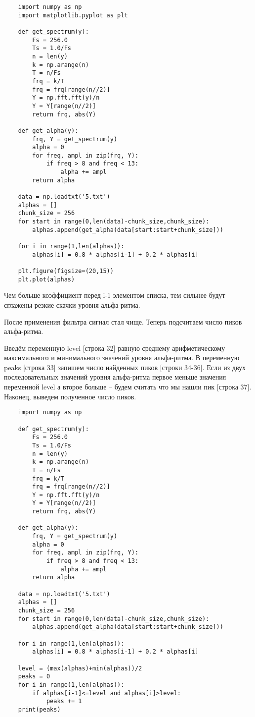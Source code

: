 \begin{verbatim}
    import numpy as np
    import matplotlib.pyplot as plt

    def get_spectrum(y):
        Fs = 256.0
        Ts = 1.0/Fs
        n = len(y)
        k = np.arange(n)
        T = n/Fs
        frq = k/T
        frq = frq[range(n//2)]
        Y = np.fft.fft(y)/n
        Y = Y[range(n//2)]
        return frq, abs(Y)

    def get_alpha(y):
        frq, Y = get_spectrum(y)
        alpha = 0
        for freq, ampl in zip(frq, Y):
            if freq > 8 and freq < 13:
                alpha += ampl
        return alpha

    data = np.loadtxt('5.txt')
    alphas = []
    chunk_size = 256
    for start in range(0,len(data)-chunk_size,chunk_size):
        alphas.append(get_alpha(data[start:start+chunk_size]))

    for i in range(1,len(alphas)):
        alphas[i] = 0.8 * alphas[i-1] + 0.2 * alphas[i]

    plt.figure(figsize=(20,15))
    plt.plot(alphas)
\end{verbatim}

Чем больше коэффициент перед i-1 элементом списка, тем сильнее будут сглажены резкие скачки уровня альфа-ритма.

После применения фильтра сигнал стал чище. Теперь подсчитаем число пиков альфа-ритма.


Введём переменную level [строка 32] равную среднему арифметическому максимального и минимального значений уровня альфа-ритма.
В переменную peaks [строка 33] запишем число найденных пиков [строки 34-36]. Если из двух последовательных значений уровня альфа-ритма первое меньше значения переменной level а второе больше – будем считать что мы нашли пик [строка 37]. Наконец, выведем полученное число пиков.

\begin{verbatim}
    import numpy as np

    def get_spectrum(y):
        Fs = 256.0
        Ts = 1.0/Fs
        n = len(y)
        k = np.arange(n)
        T = n/Fs
        frq = k/T
        frq = frq[range(n//2)]
        Y = np.fft.fft(y)/n
        Y = Y[range(n//2)]
        return frq, abs(Y)

    def get_alpha(y):
        frq, Y = get_spectrum(y)
        alpha = 0
        for freq, ampl in zip(frq, Y):
            if freq > 8 and freq < 13:
                alpha += ampl
        return alpha

    data = np.loadtxt('5.txt')
    alphas = []
    chunk_size = 256
    for start in range(0,len(data)-chunk_size,chunk_size):
        alphas.append(get_alpha(data[start:start+chunk_size]))

    for i in range(1,len(alphas)):
        alphas[i] = 0.8 * alphas[i-1] + 0.2 * alphas[i]

    level = (max(alphas)+min(alphas))/2
    peaks = 0
    for i in range(1,len(alphas)):
        if alphas[i-1]<=level and alphas[i]>level:
            peaks += 1
    print(peaks)
\end{verbatim}

